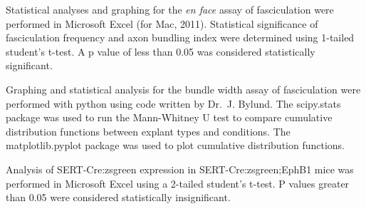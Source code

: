 Statistical analyses and graphing for the \emph{en face} assay of fasciculation were performed in Microsoft Excel (for Mac, 2011).
Statistical significance of fasciculation frequency and axon bundling index were determined using 1-tailed student's t-test.
A p value of less than 0.05 was considered statistically significant.

Graphing and statistical analysis for the bundle width assay of fasciculation were performed with python using code written by Dr.~J. Bylund.
The scipy.stats package was used to run the Mann-Whitney U test to compare cumulative distribution functions between explant types and conditions.
The matplotlib.pyplot package was used to plot cumulative distribution functions.

Analysis of SERT-Cre:zsgreen expression in SERT-Cre:zsgreen;EphB1 mice was performed in Microsoft Excel using a 2-tailed student's t-test.
P values greater than 0.05 were considered statistically insignificant.
